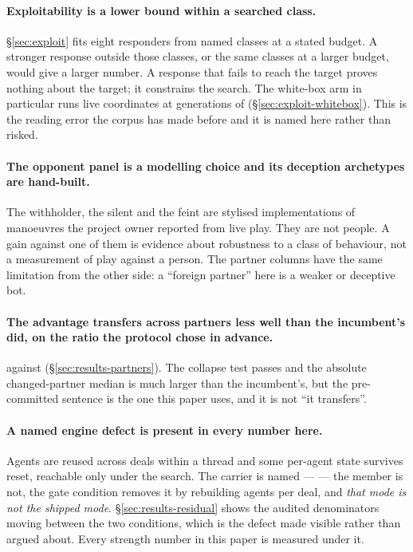 \paragraph{Exploitability is a lower bound within a searched class.}
\label{sec:limitations-lbr}
\S\ref{sec:exploit} fits eight responders from named classes at a stated budget. A stronger response
outside those classes, or the same classes at a larger budget, would give a larger number. A response
that fails to reach the target proves nothing about the target; it constrains the search. The white-box
arm in particular runs \vsevenZeightLive{} live coordinates at \vsevenBfourGens{} generations of
\vsevenBfourPop{}
(\S\ref{sec:exploit-whitebox}). This is the reading error the corpus has made before and it is named
here rather than risked.

\paragraph{The opponent panel is a modelling choice and its deception archetypes are hand-built.}
The withholder, the silent and the feint are stylised implementations of manoeuvres the project owner
reported from live play. They are not people. A gain against one of them is evidence about robustness
to a class of behaviour, not a measurement of play against a person. The partner columns have the same
limitation from the other side: a ``foreign partner'' here is a weaker or deceptive bot.

\paragraph{The advantage transfers across partners less well than the incumbent's did, on the ratio
the protocol chose in advance.}
\vsevenSoneRatio{} against \vsevenBaseRatio{} (\S\ref{sec:results-partners}). The collapse test passes
and the absolute changed-partner median is much larger than the incumbent's, but the pre-committed
sentence is the one this paper uses, and it is not ``it transfers''.

\paragraph{A named engine defect is present in every number here.}
Agents are reused across deals within a thread and some per-agent state survives reset, reachable only
under the search. The carrier is named --- \texttt{\vsevenSsixCarrier{}} --- the member is not, the
gate condition removes it by rebuilding agents per deal, and \emph{that mode is not the shipped mode}.
\S\ref{sec:results-residual} shows the audited denominators moving between the two conditions, which is
the defect made visible rather than argued about. Every strength number in this paper is measured
under it.

